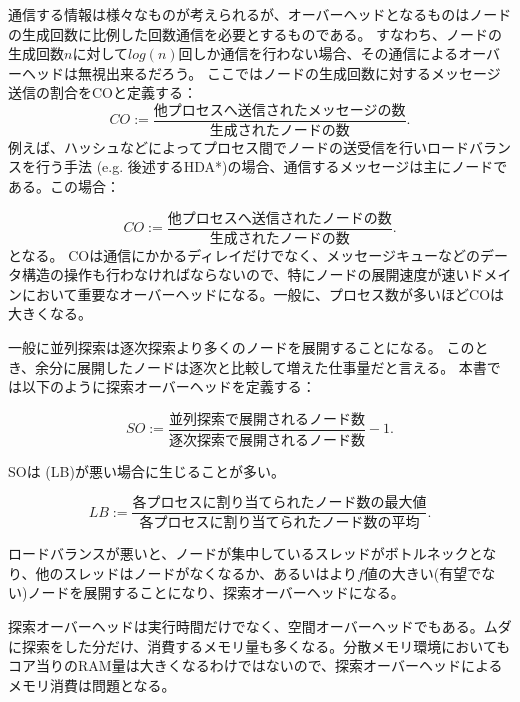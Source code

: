 通信する情報は様々なものが考えられるが、オーバーヘッドとなるものはノードの生成回数に比例した回数通信を必要とするものである。
すなわち、ノードの生成回数$n$に対して$log(n)$回しか通信を行わない場合、その通信によるオーバーヘッドは無視出来るだろう。
ここではノードの生成回数に対するメッセージ送信の割合をCOと定義する：
\begin{equation}
	CO := \frac{\text{他プロセスへ送信されたメッセージの数}}{\text{生成されたノードの数}}.
\end{equation}
例えば、ハッシュなどによってプロセス間でノードの送受信を行いロードバランスを行う手法 (e.g. 後述するHDA*)の場合、通信するメッセージは主にノードである。この場合：

\begin{equation}
	CO := \frac{\text{他プロセスへ送信されたノードの数}}{\text{生成されたノードの数}}.
\end{equation}
となる。
COは通信にかかるディレイだけでなく、メッセージキューなどのデータ構造の操作も行わなければならないので、特にノードの展開速度が速いドメインにおいて重要なオーバーヘッドになる。一般に、プロセス数が多いほどCOは大きくなる。


一般に並列探索は逐次探索より多くのノードを展開することになる。
このとき、余分に展開したノードは逐次と比較して増えた仕事量だと言える。
本書では以下のように探索オーバーヘッドを定義する：

\begin{equation}
  SO := \frac{\text{並列探索で展開されるノード数}}{\text{逐次探索で展開されるノード数}} - 1.
\end{equation}

SOは (LB)が悪い場合に生じることが多い。

\begin{equation}
LB := \frac{\text{各プロセスに割り当てられたノード数の最大値}}{\text{各プロセスに割り当てられたノード数の平均}}.
\end{equation}

ロードバランスが悪いと、ノードが集中しているスレッドがボトルネックとなり、他のスレッドはノードがなくなるか、あるいはより$f$値の大きい(有望でない)ノードを展開することになり、探索オーバーヘッドになる。

探索オーバーヘッドは実行時間だけでなく、空間オーバーヘッドでもある。ムダに探索をした分だけ、消費するメモリ量も多くなる。分散メモリ環境においてもコア当りのRAM量は大きくなるわけではないので、探索オーバーヘッドによるメモリ消費は問題となる。

